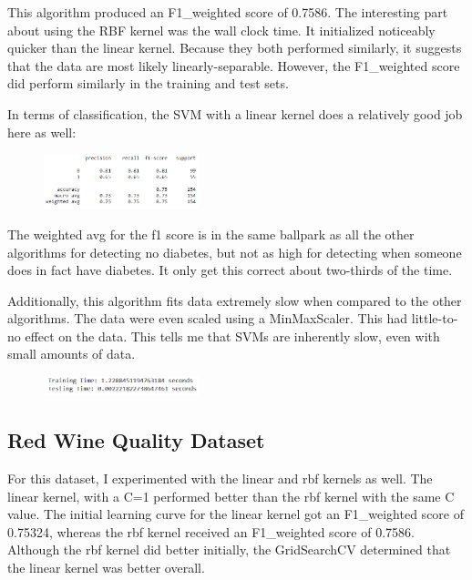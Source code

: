 \documentclass[conference]{IEEEtran}
\begin{document}
This algorithm produced an F1\_weighted score of 0.7586. The interesting part about using the RBF kernel was the wall clock time. It initialized noticeably quicker than the linear kernel. Because they both performed similarly, it suggests that the data are most likely linearly-separable. However, the F1\_weighted score did perform similarly in the training and test sets.

In terms of classification, the SVM with a linear kernel does a relatively good job here as well: 

\begin{figure}[H]
    \centering
    \includegraphics[width=0.40\textwidth]{PIMA Indian Diabetes Graphs/SVC/svc cr.png}
    \label{fig:enter-label}
\end{figure}

The weighted avg for the f1 score is in the same ballpark as all the other algorithms for detecting no diabetes, but not as high for detecting when someone does in fact have diabetes. It only get this correct about two-thirds of the time.

Additionally, this algorithm fits data extremely slow when compared to the other algorithms. The data were even scaled using a MinMaxScaler. This had little-to-no effect on the data. This tells me that SVMs are inherently slow, even with small amounts of data.

\begin{figure}[H]
    \centering
    \includegraphics[width=0.40\textwidth]{PIMA Indian Diabetes Graphs/SVC/svc wct.png}
    \label{fig:enter-label}
\end{figure}

\subsection{\textbf{Red Wine Quality Dataset}}\label{BB}

For this dataset, I experimented with the linear and rbf kernels as well. The linear kernel, with a C=1 performed better than the rbf kernel with the same C value. The initial learning curve for the linear kernel got an F1\_weighted score of 0.75324, whereas the rbf kernel received an F1\_weighted score of 0.7586. Although the rbf kernel did better initially, the GridSearchCV determined that the linear kernel was better overall. 
\end{document}
